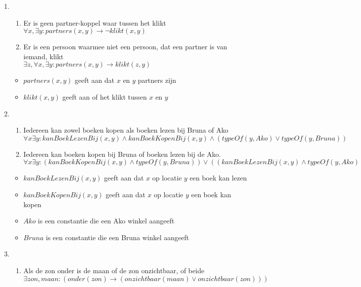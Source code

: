 \documentclass[]{article}
\begin{document}
\begin{enumerate}[a]
\begin{enumerate}[i]
\begin{itemize}
      \end{itemize}
      \item %
      \begin{enumerate}[1]
        \item Er is geen partner-koppel waar tussen het klikt \\ $\forall x, \exists y : partners(x,y) \longrightarrow \neg klikt(x,y)$
        \item Er is een persoon waarmee niet een persoon, dat een partner is van iemand, klikt \\ $\exists z, \forall x, \exists y: partners(x,y) \longrightarrow klikt(z,y) $
      \end{enumerate}
      \begin{itemize}
        \item $partners(x,y)$ geeft aan dat $x$ en $y$ partners zijn
        \item $ klikt(x,y)$ geeft aan of het klikt tussen $x$ en $y$
      \end{itemize}
      \item %
      \begin{enumerate}[1]
        \item Iedereen kan zowel boeken kopen als boeken lezen bij Bruna of Ako \\ $\forall x \exists y: kanBoekLezenBij(x,y) \land kanBoekKopenBij(x,y) \land (typeOf(y,Ako) \lor typeOf(y,Bruna)) $
        \item Iedereen kan boeken kopen bij Bruna of boeken lezen bij de Ako. \\ $\forall x \exists y: (kanBoekKopenBij(x,y) \land typeOf(y,Bruna)) \lor ((kanBoekLezenBij(x,y) \land  typeOf(y,Ako)) )  $
      \end{enumerate}
      \begin{itemize}
        \item $kanBoekLezenBij(x,y)$ geeft aan dat $x$ op locatie $y$ een boek kan lezen
        \item $kanBoekKopenBij(x,y)$ geeft aan dat $x$ op locatie $y$ een boek kan kopen
        \item $Ako$ is een constantie die een Ako winkel aangeeft
        \item $Bruna$ is een constantie die een Bruna winkel aangeeft
      \end{itemize}
      \item %
      \begin{enumerate}[1]
        \item Als de zon onder is de maan of de zon onzichtbaar, of beide \\ $\exists zon, maan : (onder(zon) \longrightarrow (onzichtbaar(maan) \lor onzichtbaar(zon)))$

\end{enumerate}
\end{enumerate}
\end{enumerate}
\end{document}
